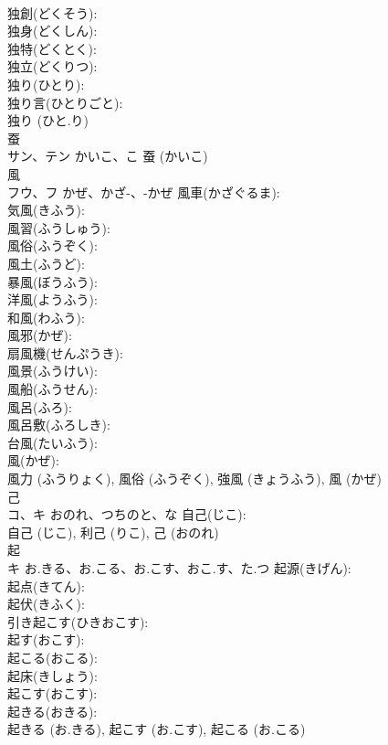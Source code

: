 \documentclass[8pt]{extreport}
\begin{document}
\begin{CJK}{UTF8}{min}
\\	独創(どくそう): 
\\	独身(どくしん): 
\\	独特(どくとく): 
\\	独立(どくりつ): 
\\	独り(ひとり): 
\\	独り言(ひとりごと): 
\\	独り (ひと.り)
\\	蚕		
\\	サン、テン	かいこ、こ		蚕 (かいこ)
\\	風		
\\	フウ、フ	かぜ、かざ-、-かぜ	風車(かざぐるま): 
\\	気風(きふう): 
\\	風習(ふうしゅう): 
\\	風俗(ふうぞく): 
\\	風土(ふうど): 
\\	暴風(ぼうふう): 
\\	洋風(ようふう): 
\\	和風(わふう): 
\\	風邪(かぜ): 
\\	扇風機(せんぷうき): 
\\	風景(ふうけい): 
\\	風船(ふうせん): 
\\	風呂(ふろ): 
\\	風呂敷(ふろしき): 
\\	台風(たいふう): 
\\	風(かぜ): 
\\	風力 (ふうりょく), 風俗 (ふうぞく), 強風 (きょうふう), 風 (かぜ)
\\	己		
\\	コ、キ	おのれ、つちのと、な	自己(じこ): 
\\	自己 (じこ), 利己 (りこ), 己 (おのれ)
\\	起		
\\	キ	お.きる、お.こる、お.こす、おこ.す、た.つ	起源(きげん): 
\\	起点(きてん): 
\\	起伏(きふく): 
\\	引き起こす(ひきおこす): 
\\	起す(おこす): 
\\	起こる(おこる): 
\\	起床(きしょう): 
\\	起こす(おこす): 
\\	起きる(おきる): 
\\	起きる (お.きる), 起こす (お.こす), 起こる (お.こる)

\end{CJK}
\end{document}
